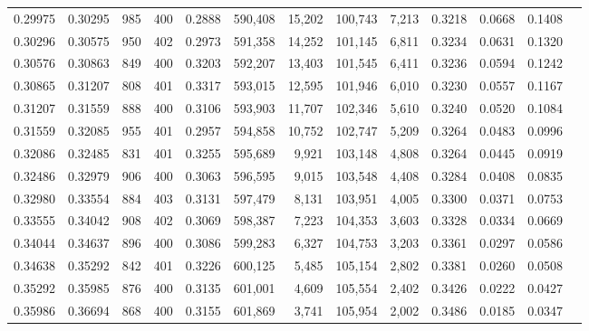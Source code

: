 \begin{tabular}{rrrrrrrrrrrrr}
0.29975 & 0.30295 &   985 & 400 &                                     0.2888 & 590,408 &  15,202 & 100,743 &   7,213 & 0.3218 & 0.0668 & 0.1408 \\
0.30296 & 0.30575 &   950 & 402 &                                     0.2973 & 591,358 &  14,252 & 101,145 &   6,811 & 0.3234 & 0.0631 & 0.1320 \\
0.30576 & 0.30863 &   849 & 400 &                                     0.3203 & 592,207 &  13,403 & 101,545 &   6,411 & 0.3236 & 0.0594 & 0.1242 \\
0.30865 & 0.31207 &   808 & 401 &                                     0.3317 & 593,015 &  12,595 & 101,946 &   6,010 & 0.3230 & 0.0557 & 0.1167 \\
0.31207 & 0.31559 &   888 & 400 &                                     0.3106 & 593,903 &  11,707 & 102,346 &   5,610 & 0.3240 & 0.0520 & 0.1084 \\
0.31559 & 0.32085 &   955 & 401 &                                     0.2957 & 594,858 &  10,752 & 102,747 &   5,209 & 0.3264 & 0.0483 & 0.0996 \\
0.32086 & 0.32485 &   831 & 401 &                                     0.3255 & 595,689 &   9,921 & 103,148 &   4,808 & 0.3264 & 0.0445 & 0.0919 \\
0.32486 & 0.32979 &   906 & 400 &                                     0.3063 & 596,595 &   9,015 & 103,548 &   4,408 & 0.3284 & 0.0408 & 0.0835 \\
0.32980 & 0.33554 &   884 & 403 &                                     0.3131 & 597,479 &   8,131 & 103,951 &   4,005 & 0.3300 & 0.0371 & 0.0753 \\
0.33555 & 0.34042 &   908 & 402 &                                     0.3069 & 598,387 &   7,223 & 104,353 &   3,603 & 0.3328 & 0.0334 & 0.0669 \\
0.34044 & 0.34637 &   896 & 400 &                                     0.3086 & 599,283 &   6,327 & 104,753 &   3,203 & 0.3361 & 0.0297 & 0.0586 \\
0.34638 & 0.35292 &   842 & 401 &                                     0.3226 & 600,125 &   5,485 & 105,154 &   2,802 & 0.3381 & 0.0260 & 0.0508 \\
0.35292 & 0.35985 &   876 & 400 &                                     0.3135 & 601,001 &   4,609 & 105,554 &   2,402 & 0.3426 & 0.0222 & 0.0427 \\
0.35986 & 0.36694 &   868 & 400 &                                     0.3155 & 601,869 &   3,741 & 105,954 &   2,002 & 0.3486 & 0.0185 & 0.0347 \\

\end{tabular}
